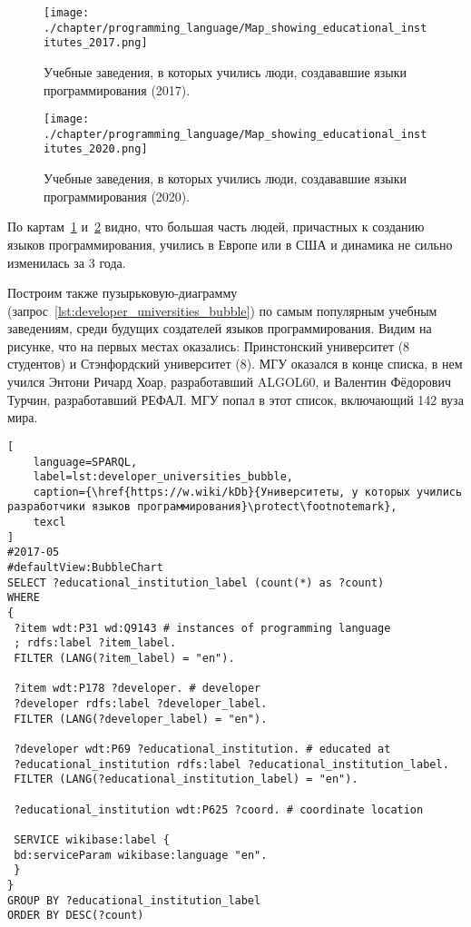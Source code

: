 \begin{figure}[h]
\centering
	\texttt{[image: ./chapter/programming\_language/Map\_showing\_educational\_institutes\_2017.png]}
	\caption{Учебные заведения, в которых учились люди, создававшие языки программирования (2017).}
	\label{fig:universities_2017}
\end{figure}
\begin{figure}[h]
\centering
	\texttt{[image: ./chapter/programming\_language/Map\_showing\_educational\_institutes\_2020.png]}
	\caption{Учебные заведения, в которых учились люди, создававшие языки программирования (2020).}
	\label{fig:universities_2020}
\end{figure}


По картам~\ref{fig:universities_2017} и~\ref{fig:universities_2020} видно, что большая часть людей, причастных к созданию языков программирования, учились в Европе или в США и динамика не сильно изменилась за 3 года.

Построим также пузырьковую-диаграмму (запрос~\ref{lst:developer_universities_bubble}) по самым популярным учебным заведениям, среди будущих создателей языков программирования. Видим на рисунке, что на первых местах оказались: Принстонский университет (8 студентов) и Стэнфордский университет (8). МГУ оказался в конце списка, в нем учился Энтони Ричард Хоар, разработавший ALGOL60, и Валентин Фёдорович Турчин, разработавший РЕФАЛ. МГУ попал в этот список, включающий 142 вуза мира.

\begin{lstlisting}[
	language=SPARQL,
	label=lst:developer_universities_bubble,
	caption={\href{https://w.wiki/kDb}{Университеты, у которых учились разработчики языков программирования}\protect\footnotemark},
	texcl
]
#2017-05
#defaultView:BubbleChart
SELECT ?educational_institution_label (count(*) as ?count)
WHERE
{
 ?item wdt:P31 wd:Q9143 # instances of programming language
 ; rdfs:label ?item_label. 
 FILTER (LANG(?item_label) = "en"). 
 
 ?item wdt:P178 ?developer. # developer
 ?developer rdfs:label ?developer_label. 
 FILTER (LANG(?developer_label) = "en"). 
 	
 ?developer wdt:P69 ?educational_institution. # educated at
 ?educational_institution rdfs:label ?educational_institution_label. 
 FILTER (LANG(?educational_institution_label) = "en").
 
 ?educational_institution wdt:P625 ?coord. # coordinate location
 
 SERVICE wikibase:label {
 bd:serviceParam wikibase:language "en".
 } 	
}
GROUP BY ?educational_institution_label
ORDER BY DESC(?count)
\end{lstlisting}

